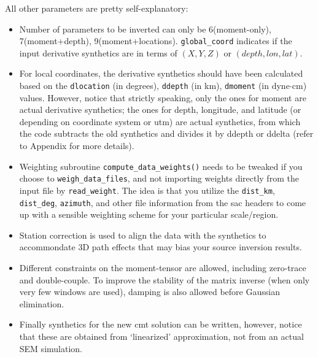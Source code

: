 \documentclass[12pt,titlepage,fleqn]{article}
\begin{document}
All other parameters are pretty self-explanatory:
\begin{itemize}
 \item Number of parameters to be inverted can only be 6(moment-only), 7(moment+depth), 9(moment+locations). \verb+global_coord+ indicates if the input derivative synthetics are in terms of $(X,Y,Z)$ or $(depth,lon,lat)$.
 \item For local coordinates, the derivative synthetics should have been calculated based on the \verb=dlocation= (in degrees), \verb=ddepth= (in km), \verb=dmoment= (in dyne$\cdot$cm) values. However, notice that strictly speaking, only the ones for moment are actual derivative synthetics; the ones for depth, longitude, and latitude (or  depending on coordinate system or utm) are actual synthetics, from which the code subtracts the old synthetics and divides it by ddepth or ddelta (refer to Appendix for more details).
 \item Weighting subroutine \verb=compute_data_weights()=  needs to be tweaked if you choose to \verb=weigh_data_files=, and not importing weights directly from the input file by \verb=read_weight=. The idea is that you utilize the \verb=dist_km=, \verb=dist_deg=, \verb=azimuth=, and other file information from the sac headers to come up with a sensible weighting scheme for your particular scale/region.
 \item Station correction is used to align the data with the synthetics to accommondate 3D path effects that may bias your source inversion results.
 \item Different constraints on the moment-tensor are allowed, including zero-trace and double-couple. To improve the stability of the matrix inverse (when only very few windows are used), damping is also allowed before Gaussian elimination.
 \item Finally synthetics for the new cmt solution can be written, however, notice that these are obtained from `linearized' approximation, not from an actual SEM simulation.
 \end{itemize}
\end{document}
